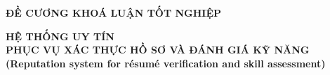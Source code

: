 \documentclass{article}[14pt]
\begin{document}
    \begin{figure}[h]
        \begin{floatrow}
        {%
    
        }
        {%
    
        }
        \end{floatrow}
    \end{figure}
    
    \begin{center}
        
        \textbf{\huge ĐỀ CƯƠNG KHOÁ LUẬN TỐT NGHIỆP} \\ 
    \end{center}
    
    
    \begin{center}
        
        \textbf{\Large HỆ THỐNG UY TÍN \\ PHỤC VỤ XÁC THỰC HỒ SƠ VÀ ĐÁNH GIÁ KỸ NĂNG} 
        \\
        
    \vspace{.5cm}
        \textbf{\Large (Reputation system for résumé verification and skill assessment)}
    \end{center}
    
\end{document}
